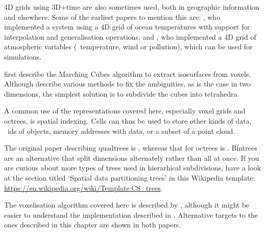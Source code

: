 4D grids using 3D+time are also sometimes used, both in geographic information and elsewhere.
Some of the earliest papers to mention this are: \citet{Mason94}, who implemented a system using a 4D grid of ocean temperatures with support for interpolation and generalisation operations, and \citet{Bernard98}, who implemented a 4D grid of atmospheric variables (\eg\ temperature, wind or pollution), which can be used for simulations.

\citet{Lorensen87} first describe the Marching Cubes algorithm to extract isosurfaces from voxels.
Although \citet{Wilhems90} describe various methods to fix the ambiguities, as is the case in two dimensions, the simplest solution is to subdivide the cubes into tetrahedra.

A common use of the representations covered here, especially voxel grids and octrees, is spatial indexing.
Cells can thus be used to store other kinds of data, \eg\ ids of objects, memory addresses with data, or a subset of a point cloud.

The original paper describing quadtrees is \citet{Finkel74}, whereas that for octrees is \citet{Meagher80}.
Bintrees~\citep{Samet85} are an alternative that split dimensions alternately rather than all at once.
If you are curious about more types of trees used in hierarhical subdivisions, have a look at the section titled `Spatial data partitioning trees' in this Wikipedia template: \url{https://en.wikipedia.org/wiki/Template:CS_trees}.

The voxelisation algorithm covered here is described by \citet{Laine13}, although it might be easier to understand the implementation described in \citet{Nourian16}.
Alternative targets to the ones described in this chapter are shown in both papers.
